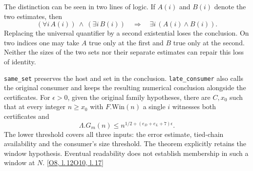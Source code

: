 \documentclass[12pt,letterpaper]{article}
\newcommand{\id}[1]{{\small\nolinkurl{#1}}}
\begin{document}
The distinction can be seen in two lines of logic. If $A(i)$ and $B(i)$ denote the two estimates, then
\[
        (\forall i\, A(i))\ \wedge\ (\exists i\,B(i))
              \quad\Longrightarrow\quad \exists i\,(A(i)\wedge B(i)).
\]
Replacing the universal quantifier by a second existential loses the conclusion. On two indices one may take $A$ true only at the first and $B$ true only at the second. Neither the sizes of the two sets nor their separate estimates can repair this loss of identity.

\id{same_set} preserves the host and set in the conclusion. \id{late_consumer} also calls the original consumer and keeps the resulting numerical conclusion alongside the certificates. For $\epsilon>0$, given the original family hypotheses, there are $C,x_0$ such that at every integer $n\geq x_0$ with $F.\mathrm{Win}(n)$ a single $i$ witnesses both certificates and
\[
        \Lambda.G_m(n)\le n^{1/2+(e_D+e_L+7)\epsilon}.
\]
The lower threshold covers all three inputs: the error estimate, tied-chain availability and the consumer's size threshold. The theorem explicitly retains the window hypothesis. Eventual readability does not establish membership in such a window at $N$. {\footnotesize\sffamily\color{mute}[\href{https://github.com/nousentllc/riemann-hypothesis/blob/40e56bab026552e089d7afcfeff08d2defb9c005/src/Development/AutomorphicArithmetic/PrimitiveCosets/CoreGm.lean#L12}{O8, l.\,12}\enspace \href{https://github.com/nousentllc/riemann-hypothesis/blob/40e56bab026552e089d7afcfeff08d2defb9c005/src/Development/AutomorphicArithmetic/PrimitiveCosets/WindowInequalityOfArtinInputs.lean#L17}{O10, l.\,17}]}
\end{document}
